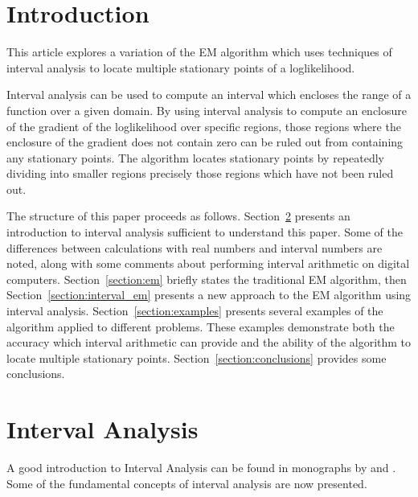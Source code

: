 
\section{Introduction}\label{section:introduction}

This article explores a variation of the EM algorithm which uses techniques
of interval analysis to locate multiple stationary points of a loglikelihood.

Interval analysis can be used to compute an interval which encloses the range
of a function over a given domain.  By using interval analysis to compute an
enclosure of the gradient of the loglikelihood over specific regions, those
regions where the enclosure of the gradient does not contain zero can be ruled
out from containing any stationary points.  The algorithm locates stationary
points by repeatedly dividing into smaller regions precisely those regions
which have not been ruled out.

The structure of this paper proceeds as follows.
Section~\ref{section:interval} presents an introduction to interval 
analysis sufficient to understand this paper.  Some of the differences between
calculations with real numbers and interval numbers are noted, along with some
comments about performing interval arithmetic on digital computers.
Section~\ref{section:em}  briefly states the traditional EM algorithm, then
Section~\ref{section:interval_em} presents a new approach to the EM algorithm
using interval analysis.
Section~\ref{section:examples} presents several examples of the algorithm 
applied
to different problems.  These examples demonstrate both the accuracy which
interval arithmetic can provide and the ability of the algorithm to locate
multiple stationary points.
Section~\ref{section:conclusions} provides some conclusions.

\section{Interval Analysis}\label{section:interval}
A good introduction to Interval Analysis can be found in monographs by
\cite{HansenBook} and \cite{Moore79}.  Some of the fundamental concepts
of interval analysis are now presented.

